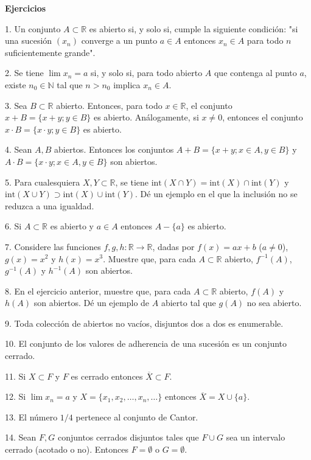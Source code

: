 \documentclass[12pt,oneside]{book}
\begin{document}
\textbf{Ejercicios}

1. Un conjunto \(A \subset \mathbb{R}\) es abierto si, y solo si, cumple la siguiente condición: "si una sucesión \((x_n)\) converge a un punto \(a \in A\) entonces \(x_n \in A\) para todo \(n\) suficientemente grande".

2. Se tiene \(\lim x_n = a\) si, y solo si, para todo abierto \(A\) que contenga al punto \(a\), existe \(n_0 \in \mathbb{N}\) tal que \(n > n_0\) implica \(x_n \in A\).

3. Sea \(B \subset \mathbb{R}\) abierto. Entonces, para todo \(x \in \mathbb{R}\), el conjunto \(x + B = \{x + y; y \in B\}\) es abierto. Análogamente, si \(x \neq 0\), entonces el conjunto \(x \cdot B = \{x \cdot y; y \in B\}\) es abierto.

4. Sean \(A, B\) abiertos. Entonces los conjuntos \(A + B = \{x + y; x \in A, y \in B\}\) y \(A \cdot B = \{x \cdot y; x \in A, y \in B\}\) son abiertos.

5. Para cualesquiera \(X, Y \subset \mathbb{R}\), se tiene \(\text{int}(X \cap Y) = \text{int}(X) \cap \text{int}(Y)\) y \(\text{int}(X \cup Y) \supset \text{int}(X) \cup \text{int}(Y)\). Dé un ejemplo en el que la inclusión no se reduzca a una igualdad.

6. Si \(A \subset \mathbb{R}\) es abierto y \(a \in A\) entonces \(A - \{a\}\) es abierto.

7. Considere las funciones \(f, g, h: \mathbb{R} \to \mathbb{R}\), dadas por \(f(x) = ax + b\) (\(a \neq 0\)), \(g(x) = x^2\) y \(h(x) = x^3\). Muestre que, para cada \(A \subset \mathbb{R}\) abierto, \(f^{-1}(A)\), \(g^{-1}(A)\) y \(h^{-1}(A)\) son abiertos.

8. En el ejercicio anterior, muestre que, para cada \(A \subset \mathbb{R}\) abierto, \(f(A)\) y \(h(A)\) son abiertos. Dé un ejemplo de \(A\) abierto tal que \(g(A)\) no sea abierto.

9. Toda colección de abiertos no vacíos, disjuntos dos a dos es enumerable.

10. El conjunto de los valores de adherencia de una sucesión es un conjunto cerrado.

11. Si \(X \subset F\) y \(F\) es cerrado entonces \(\overline{X} \subset F\).

12. Si \(\lim x_n = a\) y \(X = \{x_1, x_2, \dots, x_n, \dots\}\) entonces \(\overline{X} = X \cup \{a\}\).

13. El número \(1/4\) pertenece al conjunto de Cantor.

14. Sean \(F, G\) conjuntos cerrados disjuntos tales que \(F \cup G\) sea un intervalo cerrado (acotado o no). Entonces \(F = \emptyset\) o \(G = \emptyset\).
\end{document}

